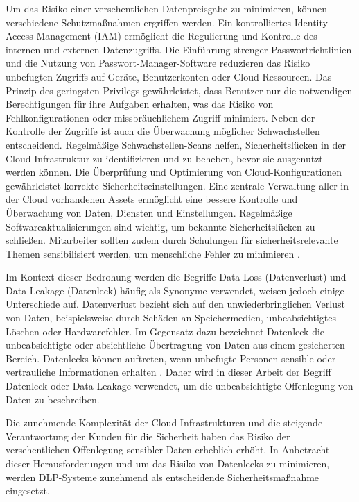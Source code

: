 Um das Risiko einer versehentlichen Datenpreisgabe zu minimieren, können verschiedene Schutzmaßnahmen ergriffen werden. Ein kontrolliertes Identity Access Management (IAM) ermöglicht die Regulierung und Kontrolle des internen und externen Datenzugriffs. Die Einführung strenger Passwortrichtlinien und die Nutzung von Passwort-Manager-Software reduzieren das Risiko unbefugten Zugriffs auf Geräte, Benutzerkonten oder Cloud-Ressourcen. Das Prinzip des geringsten Privilegs gewährleistet, dass Benutzer nur die notwendigen Berechtigungen für ihre Aufgaben erhalten, was das Risiko von Fehlkonfigurationen oder missbräuchlichem Zugriff minimiert. Neben der Kontrolle der Zugriffe ist auch die Überwachung möglicher Schwachstellen entscheidend. Regelmäßige Schwachstellen-Scans helfen, Sicherheitslücken in der Cloud-Infrastruktur zu identifizieren und zu beheben, bevor sie ausgenutzt werden können. Die Überprüfung und Optimierung von Cloud-Konfigurationen gewährleistet korrekte Sicherheitseinstellungen. Eine zentrale Verwaltung aller in der Cloud vorhandenen Assets ermöglicht eine bessere Kontrolle und Überwachung von Daten, Diensten und Einstellungen. Regelmäßige Softwareaktualisierungen sind wichtig, um bekannte Sicherheitslücken zu schließen. Mitarbeiter sollten zudem durch Schulungen für sicherheitsrelevante Themen sensibilisiert werden, um menschliche Fehler zu minimieren \cite{Brindha.2015}.

Im Kontext dieser Bedrohung werden die Begriffe Data Loss (Datenverlust) und Data Leakage (Datenleck) häufig als Synonyme verwendet, weisen jedoch einige Unterschiede auf. Datenverlust bezieht sich auf den unwiederbringlichen Verlust von Daten, beispielsweise durch Schäden an Speichermedien, unbeabsichtigtes Löschen oder Hardwarefehler. Im Gegensatz dazu bezeichnet Datenleck die unbeabsichtigte oder absichtliche Übertragung von Daten aus einem gesicherten Bereich. Datenlecks können auftreten, wenn unbefugte Personen sensible oder vertrauliche Informationen erhalten \cite{Proofpoint.2021b}. Daher wird in dieser Arbeit der Begriff Datenleck oder Data Leakage verwendet, um die unbeabsichtigte Offenlegung von Daten zu beschreiben.

Die zunehmende Komplexität der Cloud-Infrastrukturen und die steigende Verantwortung der Kunden für die Sicherheit haben das Risiko der versehentlichen Offenlegung sensibler Daten erheblich erhöht. In Anbetracht dieser Herausforderungen und um das Risiko von Datenlecks zu minimieren, werden DLP-Systeme zunehmend als entscheidende Sicherheitsmaßnahme eingesetzt.


